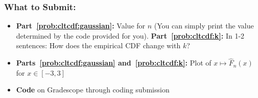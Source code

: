 \documentclass{article}
\begin{document}
\begin{aprob}
    \subsubsection*{What to Submit:}
    \begin{itemize}
        \item \textbf{Part~\ref{prob:cltcdf:gaussian}:} Value for $n$ (You can simply print the value determined by the code provided for you).
        \textbf{Part~\ref{prob:cltcdf:k}:} In 1-2 sentences: How does the empirical CDF change with $k$?
        \item \textbf{Parts~\ref{prob:cltcdf:gaussian} and~\ref{prob:cltcdf:k}:} Plot of $x\mapsto \widehat{F}_n(x)$ for $x \in [-3, 3]$
        \item \textbf{Code} on Gradescope through coding submission
    \end{itemize}
\end{aprob}
\end{document}
